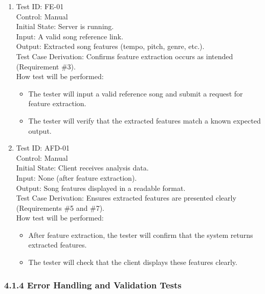 \documentclass[12pt, titlepage]{article}
\begin{document}
\begin{enumerate}

\item Test ID: FE-01\\
Control: Manual\\
Initial State: Server is running.\\
Input: A valid song reference link.\\
Output: Extracted song features (tempo, pitch, genre, etc.).\\
Test Case Derivation: Confirms feature extraction occurs as intended (Requirement \#3).\\
How test will be performed:
\begin{itemize}
    \item The tester will input a valid reference song and submit a request for feature extraction.
    \item The tester will verify that the extracted features match a known expected output.
\end{itemize}

\item Test ID: AFD-01\\
Control: Manual\\
Initial State: Client receives analysis data.\\
Input: None (after feature extraction).\\
Output: Song features displayed in a readable format.\\
Test Case Derivation: Ensures extracted features are presented clearly (Requirements \#5 and \#7).\\
How test will be performed:
\begin{itemize}
    \item After feature extraction, the tester will confirm that the system returns extracted features.
    \item The tester will check that the client displays these features clearly.
\end{itemize}

\end{enumerate}

\subsubsection{4.1.4 Error Handling and Validation Tests}
\end{document}
